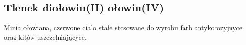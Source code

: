 \subsection{Tlenek diołowiu(II) ołowiu(IV) }
Minia ołowiana, czerwone ciało stałe stosowane do wyrobu farb antykorozyjnyce oraz kitów uszczelniającyce.

